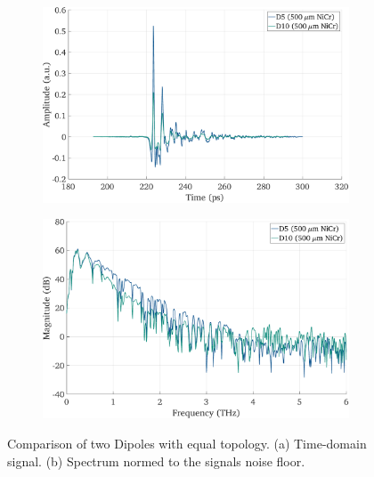 \begin{figure}[h]
    \centering
    \begin{subfigure}[b]{0.485\textwidth}
        \centering
        \includegraphics[width=\textwidth]{figures/Results/D5_D10/D5_D10_time.pdf}
        \caption{}
    \end{subfigure}
    \hfill
    \begin{subfigure}[b]{0.485\textwidth}
        \centering
        \includegraphics[width=\textwidth]{figures/Results/D5_D10/D5_D10_spectrum_nn.pdf}
        \caption{}
    \end{subfigure}
    \caption{Comparison of two Dipoles with equal topology. (a) Time-domain signal. (b) Spectrum normed to the signals noise floor.}
\end{figure}

